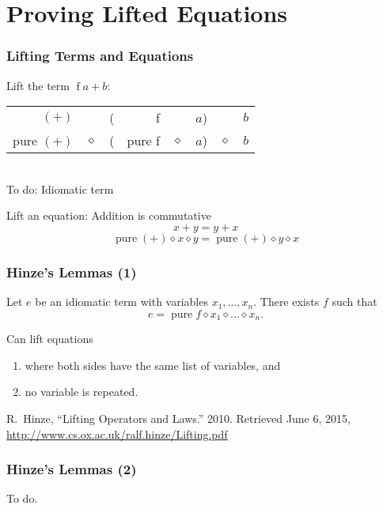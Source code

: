 \documentclass{beamer}
\newenvironment{reference}{\begingroup\scriptsize}{\endgroup}
\DeclareMathOperator{\pure}{pure}
\newcommand{\ap}{\diamond}
\begin{document}
\section{Proving Lifted Equations} %

\begin{frame}
\frametitle{Lifting Terms and Equations}

Lift the term $\operatorname{f} a + b$: \\

\vspace{5mm}
\begin{tabular}{rccrcccc}
$(+)$      &       &(& f      &       & $a$) &       &$b$ \\
pure $(+)$ & $\ap$ &(& pure f & $\ap$ & $a$) & $\ap$ & $b$
\end{tabular}
\\ To do: Idiomatic term

\vspace{10mm}
Lift an equation: Addition is commutative
\[ x + y = y + x \]
\[ \pure{(+)} \ap x \ap y = \pure{(+)} \ap y \ap x \]
\end{frame}

\begin{frame}
\frametitle{Hinze's Lemmas (1)}

\begin{lemma}
Let $e$ be an idiomatic term with variables $x_1,\dots,x_n$.
There exists $f$ such that
\[ e = \pure f \ap x_1 \ap \dots \ap x_n. \]
\end{lemma}

Can lift equations
\begin{enumerate}
\item where both sides have the same list of variables, and
\item no variable is repeated.
\end{enumerate}

\vspace{\fill}
\begin{reference}
R.\ Hinze, ``Lifting Operators and Laws.'' 2010. Retrieved June 6, 2015,
\url{http://www.cs.ox.ac.uk/ralf.hinze/Lifting.pdf}
\end{reference}
\end{frame}

\begin{frame}
\frametitle{Hinze's Lemmas (2)}

\begin{lemma}
To do.
\end{lemma}
\end{frame}
\end{document}
